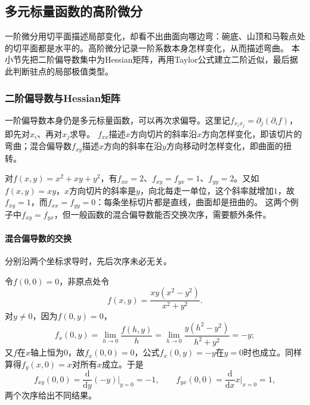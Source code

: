 \subsection{多元标量函数的高阶微分}
\label{sec:multivariable-curvature-error}

一阶微分用切平面描述局部变化，却看不出曲面向哪边弯：碗底、山顶和马鞍点处的切平面都是水平的。高阶微分记录一阶系数本身怎样变化，从而描述弯曲。
本小节先把二阶偏导数集中为Hessian矩阵，再用Taylor公式建立二阶近似，最后据此判断驻点的局部极值类型。

\subsubsection{二阶偏导数与Hessian矩阵}

一阶偏导数本身仍是多元标量函数，可以再次求偏导。这里记$f_{x_i x_j}=\partial_j(\partial_i f)$，即先对$x_i$、再对$x_j$求导。
$f_{xx}$描述$x$方向切片的斜率沿$x$方向怎样变化，即该切片的弯曲；混合偏导数$f_{xy}$描述$x$方向的斜率在沿$y$方向移动时怎样变化，即曲面的扭转。

对$f(x,y)=x^2+xy+y^2$，有$f_{xx}=2$、$f_{xy}=f_{yx}=1$、$f_{yy}=2$。又如$f(x,y)=xy$，$x$方向切片的斜率是$y$，向北每走一单位，这个斜率就增加$1$，故$f_{xy}=1$，而$f_{xx}=f_{yy}=0$：每条坐标切片都是直线，曲面却是扭曲的。
这两个例子中$f_{xy}=f_{yx}$，但一般函数的混合偏导数能否交换次序，需要额外条件。

\paragraph{混合偏导数的交换}
分别沿两个坐标求导时，先后次序未必无关。
\begin{example}[混合偏导数与求导次序有关]
\label{ex:multivariable-mixed-partials-differ}
令$f(0,0)=0$，非原点处令
\[
 f(x,y)=\frac{xy(x^2-y^2)}{x^2+y^2}.
\]
对$y\neq0$，因为$f(0,y)=0$，
\[
 f_x(0,y)=\lim_{h\to0}\frac{f(h,y)}h=\lim_{h\to0}\frac{y(h^2-y^2)}{h^2+y^2}=-y;
\]
又$f$在$x$轴上恒为$0$，故$f_x(0,0)=0$，公式$f_x(0,y)=-y$在$y=0$时也成立。同样算得$f_y(x,0)=x$对所有$x$成立。于是
\[
 f_{xy}(0,0)=\frac{\mathrm d}{\mathrm dy}(-y)\Big|_{y=0}=-1,
 \qquad
 f_{yx}(0,0)=\frac{\mathrm d}{\mathrm dx}x\Big|_{x=0}=1,
\]
两个次序给出不同结果。
\end{example}

